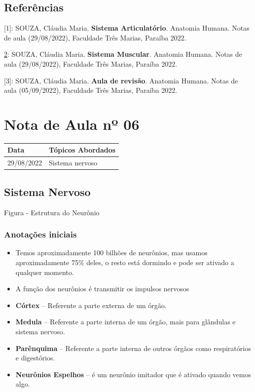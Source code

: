 \documentclass[
]{book}
\providecommand{\tightlist}{%
  \setlength{\itemsep}{0pt}\setlength{\parskip}{0pt}}
\begin{document}
\hypertarget{referuxeancias-3}{%
\subsection{Referências}\label{referuxeancias-3}}

{[}1{]}: SOUZA, Cláudia Maria. \textbf{Sistema Articulatório}. Anatomia Humana. Notas de aula (29/08/2022), Faculdade Três Marias, Paraíba 2022.

\href{MARIEB,\%20Elaine\%20N.;\%20WILHELM,\%20Patricia\%20Brady;\%20MALLAT,\%20Jon.\%20**Anatomia\%20Humana**.\%207.ed.\%20São\%20Paulo:Pearson,\%202014.}{2}: SOUZA, Cláudia Maria. \textbf{Sistema Muscular}. Anatomia Humana. Notas de aula (29/08/2022), Faculdade Três Marias, Paraíba 2022.

{[}3{]}: SOUZA, Cláudia Maria. \textbf{Aula de revisão}. Anatomia Humana. Notas de aula (05/09/2022), Faculdade Três Marias, Paraíba 2022.

\hypertarget{nota-de-aula-nuxba-06}{%
\section{Nota de Aula nº 06}\label{nota-de-aula-nuxba-06}}

\begin{longtable}[]{@{}ll@{}}
\toprule()
Data & Tópicos Abordados \\
\midrule()
\endhead
29/08/2022 & Sistema nervoso \\
\bottomrule()
\end{longtable}

\hypertarget{sistema-nervoso}{%
\subsection{Sistema Nervoso}\label{sistema-nervoso}}

Figura - Estrutura do Neurônio

\hypertarget{anotauxe7uxf5es-iniciais}{%
\subsubsection{Anotações iniciais}\label{anotauxe7uxf5es-iniciais}}

\begin{itemize}
\tightlist
\item
  Temos aproximadamente 100 bilhões de neurônios, mas usamos aproximadamente 75\% deles, o resto está dormindo e pode ser ativado a qualquer momento.
\item
  A função dos neurônios é transmitir os impulsos nervosos\\
\item
  \textbf{Córtex} -- Referente a parte externa de um órgão.
\item
  \textbf{Medula} -- Referente a parte interna de um órgão, mais para glândulas e sistema nervoso.
\item
  \textbf{Parênquima} -- Referente a parte interna de outros órgãos como respiratórios e digestórios.
\item
  \textbf{Neurônios Espelhos} -- é um neurônio imitador que é ativado quando vemos algo.
\end{itemize}
\end{document}
